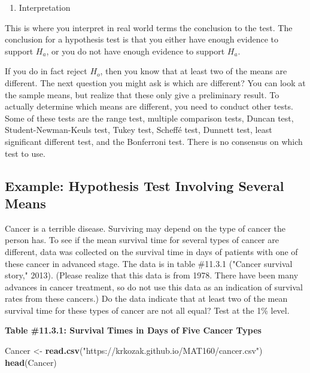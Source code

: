 \documentclass[
]{book}
\newenvironment{Shaded}{\begin{snugshade}}{\end{snugshade}}
\newcommand{\KeywordTok}[1]{\textcolor[rgb]{0.13,0.29,0.53}{\textbf{#1}}}
\newcommand{\NormalTok}[1]{#1}
\newcommand{\StringTok}[1]{\textcolor[rgb]{0.31,0.60,0.02}{#1}}
\providecommand{\tightlist}{%
  \setlength{\itemsep}{0pt}\setlength{\parskip}{0pt}}
\begin{document}
\begin{enumerate}
\def\labelenumi{\arabic{enumi}.}
\setcounter{enumi}{5}
\tightlist
\item
  Interpretation
\end{enumerate}

This is where you interpret in real world terms the conclusion to the test. The conclusion for a hypothesis test is that you either have enough evidence to support \(H_a\), or you do not have enough evidence to support \(H_a\).

If you do in fact reject \(H_o\), then you know that at least two of the means are different. The next question you might ask is which are different? You can look at the sample means, but realize that these only give a preliminary result. To actually determine which means are different, you need to conduct other tests. Some of these tests are the range test, multiple comparison tests, Duncan test, Student-Newman-Keuls test, Tukey test, Scheffé test, Dunnett test, least significant different test, and the Bonferroni test. There is no consensus on which test to use.

\hypertarget{example-hypothesis-test-involving-several-means}{%
\subsection{Example: Hypothesis Test Involving Several Means}\label{example-hypothesis-test-involving-several-means}}

Cancer is a terrible disease. Surviving may depend on the type of cancer the person has. To see if the mean survival time for several types of cancer are different, data was collected on the survival time in days of patients with one of these cancer in advanced stage. The data is in table \#11.3.1 ("Cancer survival story," 2013). (Please realize that this data is from 1978. There have been many advances in cancer treatment, so do not use this data as an indication of survival rates from these cancers.) Do the data indicate that at least two of the mean survival time for these types of cancer are not all equal? Test at the 1\% level.

\textbf{Table \#11.3.1: Survival Times in Days of Five Cancer Types}

\begin{Shaded}
\begin{Highlighting}[]
\NormalTok{Cancer <-}\StringTok{ }\KeywordTok{read.csv}\NormalTok{(}\StringTok{"https://krkozak.github.io/MAT160/cancer.csv"}\NormalTok{)}
\KeywordTok{head}\NormalTok{(Cancer)}
\end{Highlighting}
\end{Shaded}
\end{document}
